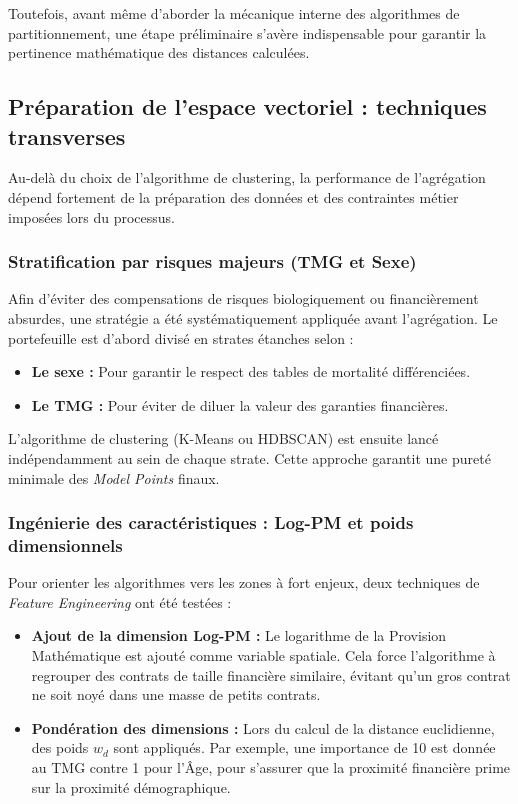 Toutefois, avant même d'aborder la mécanique interne des algorithmes de partitionnement, une étape préliminaire s'avère indispensable pour garantir la pertinence mathématique des distances calculées.

\subsection{Préparation de l'espace vectoriel : techniques transverses}
Au-delà du choix de l'algorithme de clustering, la performance de l'agrégation dépend fortement de la préparation des données et des contraintes métier imposées lors du processus.

\subsubsection*{Stratification par risques majeurs (TMG et Sexe)}
Afin d'éviter des compensations de risques biologiquement ou financièrement absurdes, une stratégie a été systématiquement appliquée avant l'agrégation. Le portefeuille est d'abord divisé en strates étanches selon :
\begin{itemize}
    \item \textbf{Le sexe :} Pour garantir le respect des tables de mortalité différenciées.
    \item \textbf{Le TMG :} Pour éviter de diluer la valeur des garanties financières.
\end{itemize}
L'algorithme de clustering (K-Means ou HDBSCAN) est ensuite lancé indépendamment au sein de chaque strate. Cette approche garantit une pureté minimale des \textit{Model Points} finaux.

\subsubsection*{Ingénierie des caractéristiques : Log-PM et poids dimensionnels}
Pour orienter les algorithmes vers les zones à fort enjeux, deux techniques de \textit{Feature Engineering} ont été testées :
\begin{itemize}
    \item \textbf{Ajout de la dimension Log-PM :} Le logarithme de la Provision Mathématique est ajouté comme variable spatiale. Cela force l'algorithme à regrouper des contrats de taille financière similaire, évitant qu'un gros contrat ne soit noyé dans une masse de petits contrats.
    \item \textbf{Pondération des dimensions :} Lors du calcul de la distance euclidienne, des poids $w_d$ sont appliqués. Par exemple, une importance de 10 est donnée au TMG contre 1 pour l'Âge, pour s'assurer que la proximité financière prime sur la proximité démographique.
\end{itemize}

